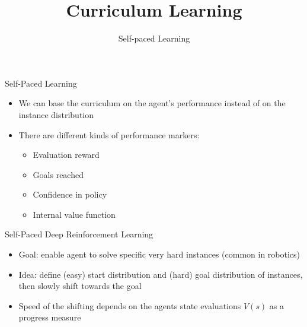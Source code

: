 


\title[Curriculum RL]{Curriculum Learning}
\subtitle{Self-paced Learning}



	
	\maketitle

\begin{frame}[c]{Self-Paced Learning}
	
	\begin{itemize}
		\item We can base the curriculum on the agent's performance instead of on the instance distribution
		\item There are different kinds of performance markers:
		\pause
		\begin{itemize}
			\item Evaluation reward
			\item Goals reached
			\item Confidence in policy
			\item Internal value function
		\end{itemize}
	\end{itemize}
	
\end{frame}

\begin{frame}[c]{Self-Paced Deep Reinforcement Learning~}
	
	\begin{itemize}
		\item Goal: enable agent to solve specific very hard instances (common in robotics)
		\item Idea: define (easy) start distribution and (hard) goal distribution of instances, then slowly shift towards the goal
		\item Speed of the shifting depends on the agents state evaluations $V(s)$ as a progress measure
	\end{itemize}
	
\end{frame}

